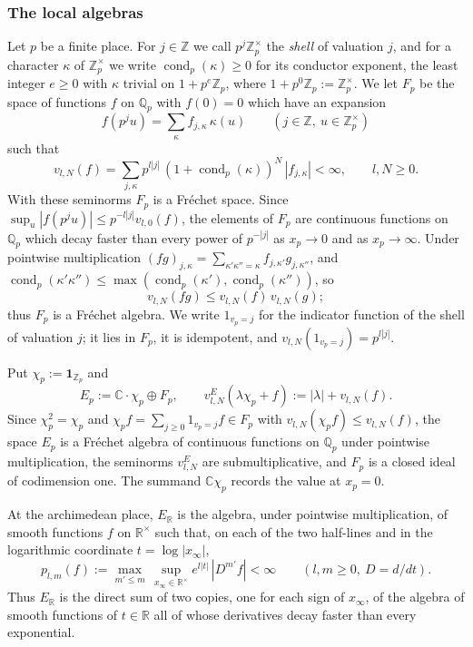 \documentclass[11pt]{amsart}
\theoremstyle{definition}
\theoremstyle{remark}
\newcommand{\C}{\mathbb C}
\newcommand{\R}{\mathbb R}
\newcommand{\Z}{\mathbb Z}
\newcommand{\Q}{\mathbb Q}
\newcommand{\cond}{\operatorname{cond}}
\begin{document}
\subsubsection*{The local algebras}
Let $p$ be a finite place.  For $j\in\Z$ we call $p^{j}\Z_p^{\times}$ the
\emph{shell} of valuation $j$, and for a character $\kappa$ of
$\Z_p^{\times}$ we write $\cond_p(\kappa)\ge0$ for its conductor exponent, the
least integer $e\ge0$ with $\kappa$ trivial on $1+p^{e}\Z_p$, where
$1+p^{0}\Z_p:=\Z_p^{\times}$.  We let $F_p$ be the space of functions $f$ on $\Q_p$ with
$f(0)=0$ which have an expansion
\[
f(p^{j}u)=\sum_{\kappa}f_{j,\kappa}\,\kappa(u)\qquad(j\in\Z,\ u\in\Z_p^{\times})
\]
such that
\begin{equation}\label{eq:seminorms}
v_{l,N}(f)=\sum_{j,\kappa}p^{l|j|}\,(1+\cond_p(\kappa))^{N}\,|f_{j,\kappa}|<\infty ,
\qquad l,N\ge0 .
\end{equation}
With these seminorms $F_p$ is a Fr\'echet space.  Since
$\sup_{u}|f(p^{j}u)|\le p^{-l|j|}v_{l,0}(f)$, the elements of $F_p$ are
continuous functions on $\Q_p$ which decay faster than every power of
$p^{-|j|}$ as $x_p\to0$ and as $x_p\to\infty$.  Under pointwise multiplication
$(fg)_{j,\kappa}=\sum_{\kappa'\kappa''=\kappa}f_{j,\kappa'}g_{j,\kappa''}$, and
$\cond_p(\kappa'\kappa'')\le\max(\cond_p(\kappa'),\cond_p(\kappa''))$, so
\[
v_{l,N}(fg)\le v_{l,N}(f)\,v_{l,N}(g);
\]
thus $F_p$ is a Fr\'echet algebra.  We write $1_{v_p=j}$ for the indicator
function of the shell of valuation $j$; it lies in $F_p$, it is idempotent,
and $v_{l,N}(1_{v_p=j})=p^{l|j|}$.

Put $\chi_p:=\mathbf 1_{\Z_p}$ and
\[
E_p:=\C\cdot\chi_p\oplus F_p,\qquad
v^{E}_{l,N}(\lambda\chi_p+f):=|\lambda|+v_{l,N}(f).
\]
Since $\chi_p^{2}=\chi_p$ and $\chi_pf=\sum_{j\ge0}1_{v_p=j}f\in F_p$ with
$v_{l,N}(\chi_pf)\le v_{l,N}(f)$, the space $E_p$ is a Fr\'echet algebra of
continuous functions on $\Q_p$ under pointwise multiplication, the seminorms
$v^{E}_{l,N}$ are submultiplicative, and $F_p$ is a closed ideal of
codimension one.  The summand $\C\chi_p$ records the value at $x_p=0$.

At the archimedean place, $E_{\R}$ is the algebra, under pointwise
multiplication, of smooth functions $f$ on $\R^{\times}$ such that, on each of
the two half-lines and in the logarithmic coordinate $t=\log|x_{\infty}|$,
\[
p_{l,m}(f):=\max_{m'\le m}\,\sup_{x_{\infty}\in\R^{\times}}e^{l|t|}\,|D^{m'}f|<\infty
\qquad(l,m\ge0,\ D=d/dt).
\]
Thus $E_{\R}$ is the direct sum of two copies, one for each sign of
$x_{\infty}$, of the algebra of smooth functions of $t\in\R$ all of whose
derivatives decay faster than every exponential.
\end{document}
